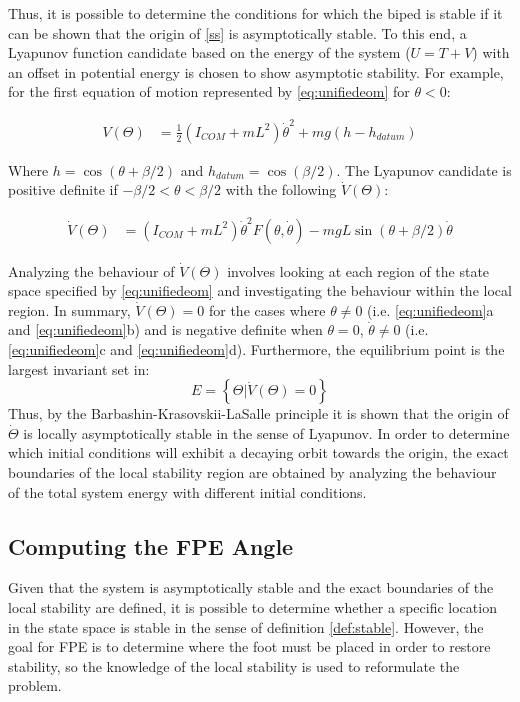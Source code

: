 Thus, it is possible to determine the conditions for which the biped is stable if it can be shown that the origin of \eqref{ss} is asymptotically stable. To this end, a Lyapunov function candidate based on the energy of the system ($U = T + V$) with an offset in potential energy is chosen to show asymptotic stability. For example, for the first equation of motion represented by \eqref{eq:unifiedeom} for $\theta < 0$: 

\begin{equation}
	\begin{aligned}
		V(\Theta) &= {\frac{1}{2}({I_{COM}} + m{L^2}){\dot \theta ^2} + mg(h - {h_{datum}})}	
		\end{aligned}
\end{equation}

Where $h =\cos (\theta+\beta/2) $ and $h_{datum} = \cos (\beta/2)$. The Lyapunov candidate is positive definite if $-\beta/2 < \theta < \beta/2$ with the following $\dot{V}(\Theta)$: 

\begin{equation}
	\begin{aligned}
			\dot{V}(\Theta) &= ({I_{COM}} + m{L^2}){\dot \theta ^2}F(\theta ,\dot \theta ) - mgL\sin (\theta  + \beta /2)\dot \theta
	\end{aligned}
\end{equation}

Analyzing the behaviour of $\dot{V}(\Theta)$ involves looking at each region of the state space specified by \eqref{eq:unifiedeom} and investigating the behaviour within the local region. In summary, $\dot{V}(\Theta) = 0$ for the cases where $\theta \not= 0$  (i.e. \ref{eq:unifiedeom}a and \ref{eq:unifiedeom}b) and is negative definite when $\theta = 0$, $\dot{\theta} \not= 0$ (i.e. \ref{eq:unifiedeom}c and \ref{eq:unifiedeom}d). Furthermore, the equilibrium point is the largest invariant set in: 
\[E = \left\{ {\Theta |\dot V(\Theta ) = 0} \right\}\]
Thus, by the Barbashin-Krasovskii-LaSalle principle it is shown that the origin of $\dot{\Theta}$ is locally asymptotically stable in the sense of Lyapunov. In order to determine which initial conditions will exhibit a decaying orbit towards the origin, the exact boundaries of the local stability region are obtained by analyzing the behaviour of the total system energy with different initial conditions. 

\subsection{Computing the FPE Angle} %
\label{sub:computing_the_fpe_angle}
Given that the system is asymptotically stable and the exact boundaries of the local stability are defined, it is possible to determine whether a specific location in the state space is stable in the sense of definition \ref{def:stable}. However, the goal for FPE is to determine where the foot must be placed in order to restore stability, so the knowledge of the local stability is used to reformulate the problem. 

